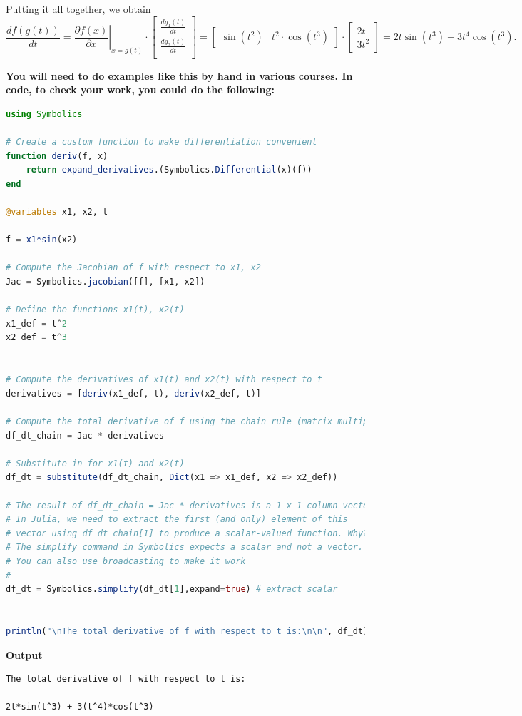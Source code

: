 Putting it all together, we obtain
$$
\frac{df(g(t))}{dt} =  \left. \frac{\partial f(x)}{\partial x}\right|_{x = g(t)} \cdot  \left[
\begin{array}{c}
\frac{d g_1(t)}{dt} \\
\frac{d g_2(t)}{dt}  \\
\end{array}
\right] = \left[ \begin{array}{cc}
\sin(t^2) &
t^2 \cdot \cos(t^3) 
\end{array}
\right] \cdot  \left[
\begin{array}{c}
2 t\\
3 t^2
\end{array}
\right] = 2 t \sin\left( t^{3} \right) + 3 t^{4} \cos\left( t^{3} \right).
$$
\Qed

\bigskip

\textbf{You will need to do examples like this by hand in various courses. In code, to check your work, you could do the following:}

\begin{lstlisting}[language=Julia,style=mystyle]
using Symbolics

# Create a custom function to make differentiation convenient
function deriv(f, x)
    return expand_derivatives.(Symbolics.Differential(x)(f))
end

@variables x1, x2, t

f = x1*sin(x2)

# Compute the Jacobian of f with respect to x1, x2
Jac = Symbolics.jacobian([f], [x1, x2])

# Define the functions x1(t), x2(t)
x1_def = t^2
x2_def = t^3


# Compute the derivatives of x1(t) and x2(t) with respect to t
derivatives = [deriv(x1_def, t), deriv(x2_def, t)]

# Compute the total derivative of f using the chain rule (matrix multiplication)
df_dt_chain = Jac * derivatives

# Substitute in for x1(t) and x2(t)
df_dt = substitute(df_dt_chain, Dict(x1 => x1_def, x2 => x2_def))
    
# The result of df_dt_chain = Jac * derivatives is a 1 x 1 column vector. 
# In Julia, we need to extract the first (and only) element of this 
# vector using df_dt_chain[1] to produce a scalar-valued function. Why?
# The simplify command in Symbolics expects a scalar and not a vector.
# You can also use broadcasting to make it work
#    
df_dt = Symbolics.simplify(df_dt[1],expand=true) # extract scalar


println("\nThe total derivative of f with respect to t is:\n\n", df_dt)
\end{lstlisting}
\textbf{Output} 
\begin{verbatim}
The total derivative of f with respect to t is:

2t*sin(t^3) + 3(t^4)*cos(t^3)
\end{verbatim}

